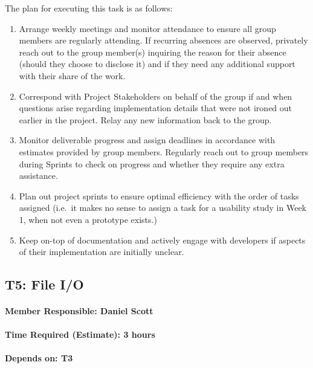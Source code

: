\documentclass[
  paper=a4,
  ,captions=tableheading
]{scrartcl}
\begin{document}
The plan for executing this task is as follows:

\begin{enumerate}
	\item Arrange weekly meetings and monitor attendance to ensure all group members are regularly attending. If recurring absences are observed, privately reach out to the group member(s) inquiring the reason for their absence (should they choose to disclose it) and if they need any additional support with their share of the work.
	\item Correspond with Project Stakeholders on behalf of the group if and when questions arise regarding implementation details that were not ironed out earlier in the project. Relay any new information back to the group. 
	\item Monitor deliverable progress and assign deadlines in accordance with estimates provided by group members. Regularly reach out to group members during Sprints to check on progress and whether they require any extra assistance.
	\item Plan out project sprints to ensure optimal efficiency with the order of tasks assigned (i.e.~it makes no sense to assign a task for a usability study in Week 1, when not even a prototype exists.) 
	\item Keep on-top of documentation and actively engage with developers if aspects of their implementation are initially unclear.
\end{enumerate}

\newpage
\hypertarget{t5-file-io}{%
\subsection{T5: File I/O}\label{t5-file-io}}

\hypertarget{member-responsible-daniel-scott-1}{%
\paragraph{Member Responsible: Daniel
Scott}\label{member-responsible-daniel-scott-1}}

\hypertarget{time-required-estimate-3-hours}{%
\paragraph{Time Required (Estimate): 3
hours}\label{time-required-estimate-3-hours}}

\hypertarget{depends-on-t3}{%
\paragraph{Depends on: T3}\label{depends-on-t3}}
\end{document}
